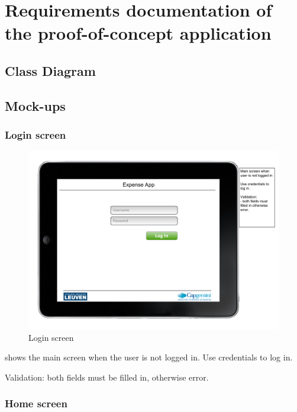 \chapter{Requirements documentation of the proof-of-concept application}
\label{app:poc}

\section{Class Diagram}

\section{Mock-ups}

\subsection{Login screen}

\begin{figure}[h!]
    \includegraphics[width=\textwidth]{figs/poc/login-screen.pdf}
    \caption{Login screen}
    \label{fig:app-login-screen}
\end{figure}

 shows the main screen when the user is not logged in. Use credentials to log in.

Validation: both fields must be filled in, otherwise error.

\subsection{Home screen }


